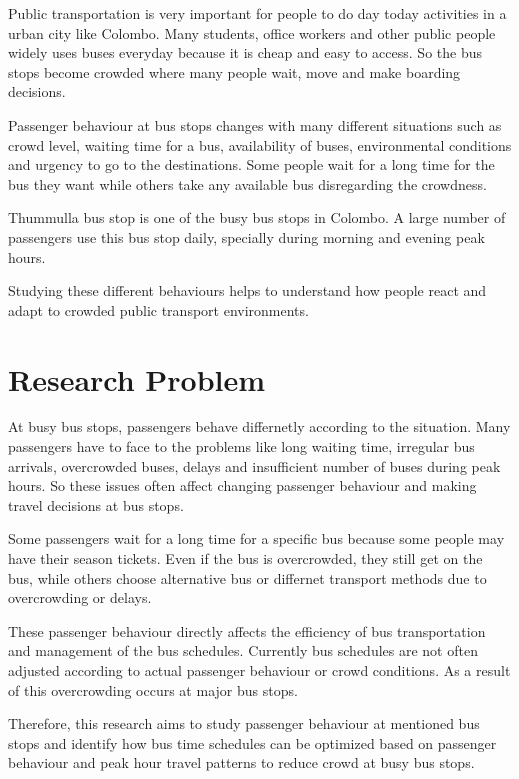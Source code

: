 \documentclass[12pt,a4paper]{report}
\begin{document}
Public transportation is very important for people to do day today activities in a urban city like Colombo. Many students, office workers and other public people widely uses buses everyday because it is cheap and easy to access. So the bus stops become crowded where many people wait, move and make boarding decisions.

Passenger behaviour at bus stops changes with many different situations such as crowd level, waiting time for a bus, availability of buses, environmental conditions and urgency to go to the destinations. Some people wait for a long time for the bus they want while others take any available bus disregarding the crowdness.

Thummulla bus stop is one of the busy bus stops in Colombo. A large number of passengers use this bus stop daily, specially during morning and  evening peak hours. 

Studying these different behaviours helps to understand how people react and adapt to crowded public transport environments.


\section{Research Problem}

At busy bus stops, passengers behave differnetly according to the situation. Many passengers have to face to the problems like long waiting time, irregular bus arrivals, overcrowded buses, delays and insufficient number of buses during peak hours. So these issues often affect changing passenger behaviour and making travel decisions at bus stops.

Some passengers wait for a long time for a specific bus because some people may have their season tickets. Even if the bus is overcrowded, they still get on the bus, while others choose alternative bus or differnet transport methods due to overcrowding or delays.

These passenger behaviour directly affects the efficiency of bus transportation and management of the bus schedules.
Currently bus schedules are not often adjusted according to actual passenger behaviour or crowd conditions. As a result of this overcrowding occurs at major bus stops.

Therefore, this research aims to study passenger behaviour at mentioned bus stops and identify how bus time schedules can be optimized based on passenger behaviour and peak hour travel patterns to reduce crowd at busy bus stops. 
\end{document}
